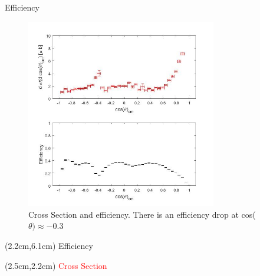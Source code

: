 \documentclass[
		10pt
		]{beamer}
\begin{document}
\begin{frame}{Efficiency}
	\centering
	\begin{figure}
		\includegraphics[width=8.3cm]{Plots/4}
		\captionsetup{labelformat=empty}
		\caption{Cross Section and efficiency. There is an efficiency drop at cos($\theta) \approx -0.3$}
	\end{figure}




\begin{textblock*}{4cm}(2.2cm,6.1cm)
	Efficiency
\end{textblock*}

\begin{textblock*}{4cm}(2.5cm,2.2cm)
	\textcolor{red}{Cross Section}
\end{textblock*}

\end{frame}
\end{document}

